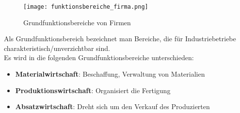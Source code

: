 \documentclass[asp1.tex]{subfiles}
\begin{document}
\begin{figure}[H]
    \begin{center}
        \texttt{[image: funktionsbereiche\_firma.png]}
    \end{center}
    \caption{Grundfunktionsbereiche von Firmen}
    \label{fig: Grundfunktionsbereiche von Firmen}
\end{figure}
Als Grundfunktionsbereich bezeichnet man Bereiche, die für Industriebetriebe charakteristisch/unverzichtbar sind. \\
Es wird in die folgenden Grundfunktionsbereiche unterschieden:
\begin{itemize}
    \item \textbf{Materialwirtschaft}: Beschaffung, Verwaltung von  Materialien
    \item \textbf{Produktionswirtschaft}: Organisiert die Fertigung
    \item \textbf{Absatzwirtschaft}: Dreht sich um den Verkauf des Produzierten
\end{itemize}
\end{document}
